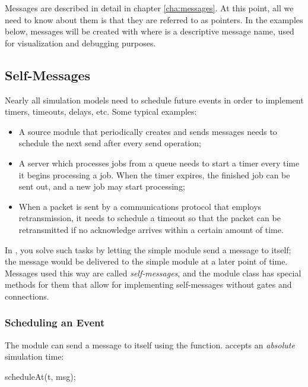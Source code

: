 Messages are described in detail in chapter \ref{cha:messages}.
At this point, all we need to know about them is that they are
referred to as  pointers. In the examples below,
messages will be created with  where
 is a descriptive message name, used for visualization
and debugging purposes.


\subsection{Self-Messages}
\label{sec:simple-modules:self-messages}

Nearly all simulation models need to schedule future events in order
to implement timers, timeouts, delays, etc. Some typical examples:

\begin{itemize}
  \item A source module that periodically creates and sends messages
    needs to schedule the next send after every send operation;
  \item A server which processes jobs from a queue needs to start
    a timer every time it begins processing a job. When the timer
    expires, the finished job can be sent out, and a new job may
    start processing;
  \item When a packet is sent by a communications protocol that employs
    retransmission, it needs to schedule a timeout so that the packet
    can be retransmitted if no acknowledge arrives within a certain
    amount of time.
\end{itemize}

In {\opp}, you solve such tasks by letting the simple module send a message
to itself; the message would be delivered to the simple module at a later
point of time. Messages used this way are called
\textit{self-messages}, and the module class has
special methods for them that allow for implementing self-messages without
gates and connections.

\subsubsection{Scheduling an Event}
\label{sec:simple-modules:scheduling}

The module can send a message to itself using the  function.
 accepts an \textit{absolute} simulation time:

\begin{cpp}
scheduleAt(t, msg);
\end{cpp}

